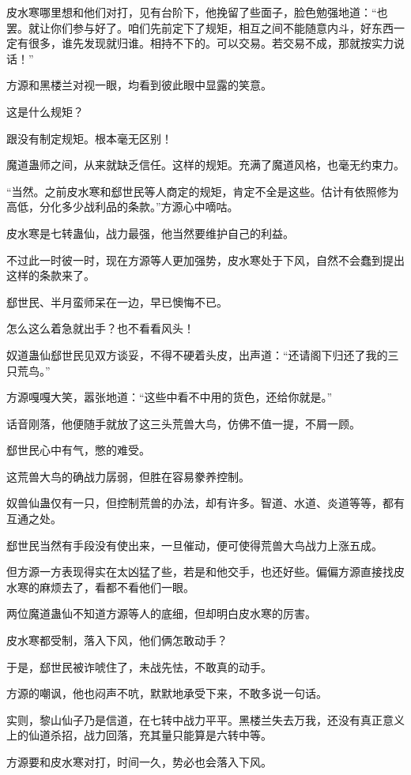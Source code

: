 \begin{this_body}
皮水寒哪里想和他们对打，见有台阶下，他挽留了些面子，脸色勉强地道：“也罢。就让你们参与好了。咱们先前定下了规矩，相互之间不能随意内斗，好东西一定有很多，谁先发现就归谁。相持不下的。可以交易。若交易不成，那就按实力说话！”

方源和黑楼兰对视一眼，均看到彼此眼中显露的笑意。

这是什么规矩？

跟没有制定规矩。根本毫无区别！

魔道蛊师之间，从来就缺乏信任。这样的规矩。充满了魔道风格，也毫无约束力。

“当然。之前皮水寒和郄世民等人商定的规矩，肯定不全是这些。估计有依照修为高低，分化多少战利品的条款。”方源心中嘀咕。

皮水寒是七转蛊仙，战力最强，他当然要维护自己的利益。

不过此一时彼一时，现在方源等人更加强势，皮水寒处于下风，自然不会蠢到提出这样的条款来了。

郄世民、半月蛮师呆在一边，早已懊悔不已。

怎么这么着急就出手？也不看看风头！

奴道蛊仙郄世民见双方谈妥，不得不硬着头皮，出声道：“还请阁下归还了我的三只荒鸟。”

方源嘎嘎大笑，嚣张地道：“这些中看不中用的货色，还给你就是。”

话音刚落，他便随手就放了这三头荒兽大鸟，仿佛不值一提，不屑一顾。

郄世民心中有气，憋的难受。

这荒兽大鸟的确战力孱弱，但胜在容易豢养控制。

奴兽仙蛊仅有一只，但控制荒兽的办法，却有许多。智道、水道、炎道等等，都有互通之处。

郄世民当然有手段没有使出来，一旦催动，便可使得荒兽大鸟战力上涨五成。

但方源一方表现得实在太凶猛了些，若是和他交手，也还好些。偏偏方源直接找皮水寒的麻烦去了，看都不看他们一眼。

两位魔道蛊仙不知道方源等人的底细，但却明白皮水寒的厉害。

皮水寒都受制，落入下风，他们俩怎敢动手？

于是，郄世民被诈唬住了，未战先怯，不敢真的动手。

方源的嘲讽，他也闷声不吭，默默地承受下来，不敢多说一句话。

实则，黎山仙子乃是信道，在七转中战力平平。黑楼兰失去万我，还没有真正意义上的仙道杀招，战力回落，充其量只能算是六转中等。

方源要和皮水寒对打，时间一久，势必也会落入下风。


\end{this_body}
